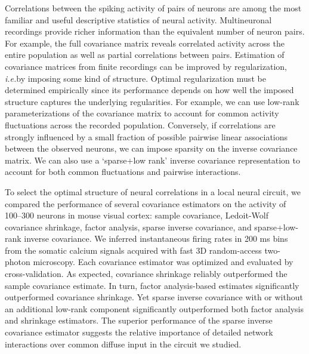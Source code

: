 Correlations between the spiking activity of pairs of neurons are among the most familiar and useful descriptive statistics of neural activity. Multineuronal recordings provide richer information than the equivalent number of neuron pairs. For example, the full covariance matrix reveals correlated activity across the entire population as well as partial correlations between pairs.  Estimation of covariance matrices from finite recordings can be improved by regularization, \emph{i.e.}\;by imposing some kind of structure.  Optimal regularization must be determined empirically since its performance depends on how well the imposed structure captures the underlying regularities. For example, we can use low-rank parameterizations of the covariance matrix to account for common activity fluctuations across the recorded population. Conversely, if correlations are strongly influenced by a small fraction of possible pairwise linear associations between the observed neurons, we can impose sparsity on the inverse covariance matrix. We can also use a `sparse+low rank’ inverse covariance representation to account for both common fluctuations and pairwise interactions.  

To select the optimal structure of neural correlations in a local neural circuit, we compared the performance of several covariance estimators on the activity of 100--300 neurons in mouse visual cortex: sample covariance, Ledoit-Wolf covariance shrinkage, factor analysis, sparse inverse covariance, and sparse+low-rank inverse covariance. We inferred instantaneous firing rates in 200 ms bins from the somatic calcium signals acquired with fast 3D random-access two-photon microscopy.  Each covariance estimator was optimized and evaluated by cross-validation. As expected, covariance shrinkage reliably outperformed the sample covariance estimate. In turn, factor analysis-based estimates significantly outperformed covariance shrinkage. Yet sparse inverse covariance with or without an additional low-rank component significantly outperformed both factor analysis and shrinkage estimators. The superior performance of the sparse inverse covariance estimator suggests the relative importance of detailed network interactions over common diffuse input in the circuit we studied.